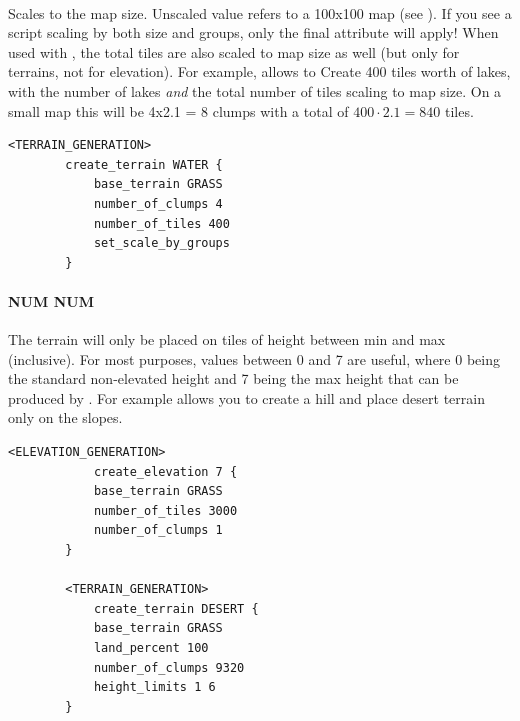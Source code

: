     \paragraph{}

    Scales  to the map size. Unscaled value refers to a 100x100 map (see ). If you see a script scaling by both size and groups, only the final attribute will apply! When used with , the total tiles are also scaled to map size as well (but only for terrains, not for elevation). For example,  allows to  Create 400 tiles worth of lakes, with the number of lakes \textit{and} the total number of tiles scaling to map size. On a small map this will be 4x2.1 = 8 clumps with a total of $400 \cdot 2.1 = 840$ tiles.

    \begin{lstlisting}[language={rms},label={lst:setscalebygroups}]
        <TERRAIN_GENERATION>
        create_terrain WATER {
            base_terrain GRASS
            number_of_clumps 4
            number_of_tiles 400
            set_scale_by_groups
        }
    \end{lstlisting}

    \paragraph{}

    \paragraph{ NUM NUM}

    The terrain will only be placed on tiles of height between min and max (inclusive). For most purposes, values between 0 and 7 are useful, where 0 being the standard non-elevated height and 7 being the max height that can be produced by . For example  allows you to create a hill and place desert terrain only on the slopes.

    \begin{lstlisting}[language={rms},label={lst:heightslimits}]
        <ELEVATION_GENERATION>
            create_elevation 7 {
            base_terrain GRASS
            number_of_tiles 3000
            number_of_clumps 1
        }

        <TERRAIN_GENERATION>
            create_terrain DESERT {
            base_terrain GRASS
            land_percent 100
            number_of_clumps 9320
            height_limits 1 6
        }
    \end{lstlisting}

